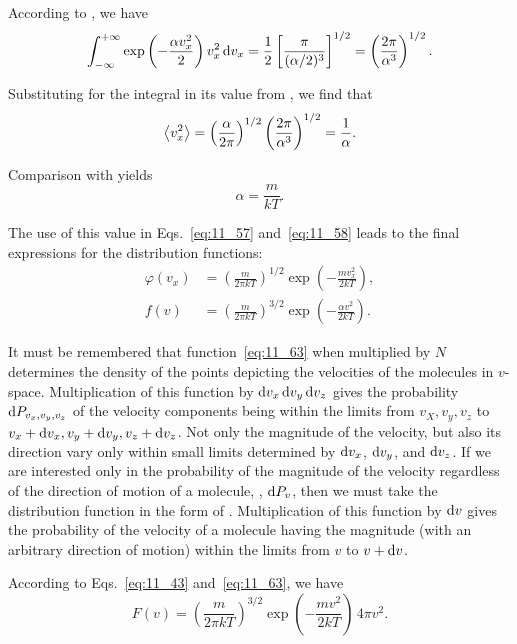 \noindent
According to , we have
\begin{equation}\label{eq:11_60}
	\int_{-\infty}^{+\infty} \exp\left(-\frac{\alpha v_x^2}{2}\right) v_x^2\,\mathrm{d} v_x = \frac{1}{2}\left[\frac{\pi}{(\alpha/2)^3}\right]^{1/2} = \left(\frac{2\pi}{\alpha^3}\right)^{1/2}.
\end{equation}

Substituting for the integral in  its value from , we find that
\begin{equation*}
	\left\langle v_x^2 \right\rangle = \left(\frac{\alpha}{2\pi}\right)^{1/2} \left(\frac{2\pi}{\alpha^3}\right)^{1/2} = \frac{1}{\alpha}.
\end{equation*}

\noindent
Comparison with  yields
\begin{equation}\label{eq:11_61}
	\alpha = \frac{m}{kT}.
\end{equation}

\noindent
The use of this value in Eqs.~\eqref{eq:11_57} and~\eqref{eq:11_58} leads to the final expressions for the distribution functions:
\begin{align}
	\varphi(v_x) &= \left(\frac{m}{2\pi kT}\right)^{1/2} \exp\left(-\frac{m v_x^2}{2kT}\right), \label{eq:11_62}\\
	f(v) &= \left(\frac{m}{2\pi kT}\right)^{3/2} \exp\left(-\frac{\alpha v^2}{2kT}\right).\label{eq:11_63}
\end{align}

It must be remembered that function~\eqref{eq:11_63} when multiplied by $N$ determines the density of the points depicting the velocities of the molecules in $v$-space. Multiplication of this function by $\mathrm{d} v_x\,\mathrm{d} v_y\,\mathrm{d} v_z$ gives the probability $\mathrm{d} P_{v_x,v_y,v_z}$ of the velocity components being within the limits from $v_X, v_y, v_z$ to $v_x+\mathrm{d} v_x, v_y+\mathrm{d} v_y, v_z+\mathrm{d} v_z$. Not only the magnitude of the velocity, but also its direction vary only within small limits determined by $\mathrm{d} v_x$, $\mathrm{d} v_y$, and $\mathrm{d} v_z$.
If we are interested only in the probability of the magnitude of the velocity regardless of the direction of motion of a molecule, \ie, $\mathrm{d} P_v$, then we must take the distribution function in the form of . Multiplication of this function by $\mathrm{d} v$ gives the probability of the velocity of a molecule having the magnitude (with an arbitrary direction of motion) within the limits from $v$ to $v+\mathrm{d} v$.

According to Eqs.~\eqref{eq:11_43} and~\eqref{eq:11_63}, we have
\begin{equation}\label{eq:11_64}
	F(v) = \left(\frac{m}{2\pi kT}\right)^{3/2} \exp\left(-\frac{mv^2}{2kT}\right)\,4\pi v^2.
\end{equation}

